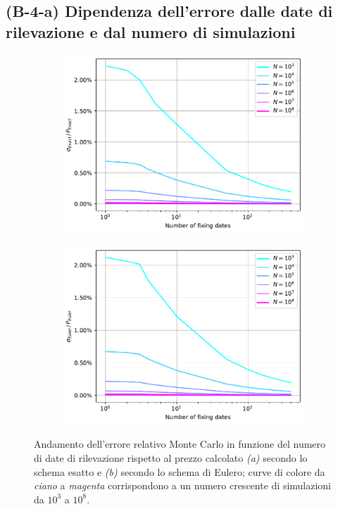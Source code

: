 \subsection{(B-4-a) Dipendenza dell'errore dalle date di rilevazione e dal numero di simulazioni} \label{sec:error_vs_m_and_N}

\begin{figure}[t]
\centering
\begin{subfigure}{.5\textwidth}
  \centering
  \includegraphics[scale=0.5]{graphs/OptionPriceVsM_ExactErrorVsM_WithDifferentNs.pdf}
  \caption{}
  \label{fig:exact_error_M}
\end{subfigure}%
\begin{subfigure}{.5\textwidth}
  \centering
  \includegraphics[scale=0.5]{graphs/OptionPriceVsM_EulerErrorVsM_WithDifferentNs.pdf}
  \caption{}
  \label{fig:euler_error_M}
\end{subfigure}
\caption[Andamento dell'errore relativo Monte Carlo in funzione del numero di date di rilevazione rispetto al prezzo calcolato secondo lo schema esatto e secondo lo schema di Eulero.]{Andamento dell'errore relativo Monte Carlo in funzione del numero di date di rilevazione rispetto al prezzo calcolato \textit{(a)} secondo lo schema esatto e \textit{(b)} secondo lo schema di Eulero; curve di colore da \textit{ciano} a \textit{magenta} corrispondono a un numero crescente di simulazioni da ${10}^3$ a ${10}^8$.}
\end{figure}

